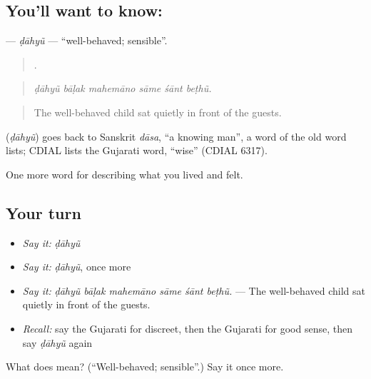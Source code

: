 \subsection*{You'll want to know: }
\textbf{} — \emph{ḍāhyũ} — \textquotedblleft{}well-behaved; sensible\textquotedblright{}.

\begin{quote}
     .
\end{quote}

\begin{quote}
\emph{ḍāhyũ bāḷak mahemāno sāme śānt beṭhũ.}
\end{quote}

\begin{quote}
The well-behaved child sat quietly in front of the guests.
\end{quote}

\begin{cousinweb}
\textbf{} (\emph{ḍāhyũ}) goes back to Sanskrit \emph{dāsa}, \textquotedblleft{}a knowing man\textquotedblright{}, a word of the old word lists; CDIAL lists the Gujarati word, \textquotedblleft{}wise\textquotedblright{} (CDIAL 6317).
\end{cousinweb}

\begin{grammarlens}[title={What you've built}]
One more word for describing what you lived and felt.
\end{grammarlens}

\subsection*{Your turn}
\begin{itemize}
\raggedright
  \item \emph{Say it:} \emph{ḍāhyũ}
  \item \emph{Say it:} \emph{ḍāhyũ}, once more
  \item \emph{Say it:} \emph{ḍāhyũ bāḷak mahemāno sāme śānt beṭhũ.} — The well-behaved child sat quietly in front of the guests.
  \item \emph{Recall:} say the Gujarati for discreet, then the Gujarati for good sense, then say \emph{ḍāhyũ} again
\end{itemize}

\begin{tcolorbox}[breakable,colback=teal!4,colframe=teal!35!black,title={Before you move on}]
What does  mean? (\textquotedblleft{}Well-behaved; sensible\textquotedblright{}.) Say it once more.
\end{tcolorbox}
